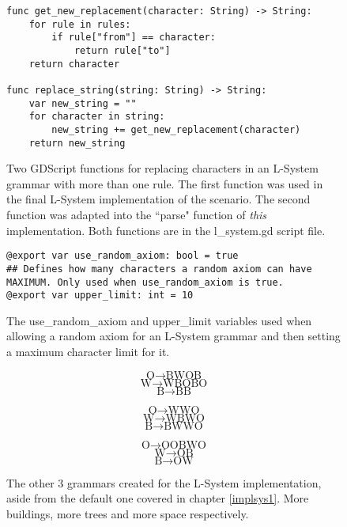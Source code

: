 \begin{figure}[H]
    \centering
    \begin{lstlisting}
func get_new_replacement(character: String) -> String:
	for rule in rules:
		if rule["from"] == character:
			return rule["to"]
	return character

func replace_string(string: String) -> String:
	var new_string = ""
	for character in string:
		new_string += get_new_replacement(character)
	return new_string
    \end{lstlisting}
    \caption{Two GDScript functions for replacing characters in an L-System grammar with more than one rule. The first function was used in the final L-System implementation of the scenario. The second function was adapted into the ``parse" function of \emph{this} implementation. Both functions are in the l\_system.gd script file.}
    \label{fig:lsystem2}
\end{figure}

\begin{figure}[H]
    \centering
    \begin{lstlisting}
@export var use_random_axiom: bool = true
## Defines how many characters a random axiom can have MAXIMUM. Only used when use_random_axiom is true.
@export var upper_limit: int = 10
    \end{lstlisting}
    \caption{The use\_random\_axiom and upper\_limit variables used when allowing a random axiom for an L-System grammar and then setting a maximum character limit for it.}
    \label{fig:lsystem3}
\end{figure}

\begin{figure}[H]
    \centering
    $$ \mbox{O} \rightarrow \mbox{B}\mbox{W}\mbox{O}\mbox{B} $$
    $$ \mbox{W} \rightarrow \mbox{W}\mbox{B}\mbox{O}\mbox{B}\mbox{O} $$
    $$ \mbox{B} \rightarrow \mbox{B}\mbox{B} $$
    
    $$ \mbox{O} \rightarrow \mbox{W}\mbox{W}\mbox{O} $$ 
    $$ \mbox{W} \rightarrow \mbox{W}\mbox{B}\mbox{W}\mbox{O} $$
    $$ \mbox{B} \rightarrow \mbox{B}\mbox{W}\mbox{W}\mbox{O} $$
    
    $$ \mbox{O} \rightarrow \mbox{O}\mbox{O}\mbox{B}\mbox{W}\mbox{O} $$ 
    $$ \mbox{W} \rightarrow \mbox{O}\mbox{B} $$
    $$ \mbox{B} \rightarrow \mbox{O}\mbox{W} $$
    \caption{The other 3 grammars created for the L-System implementation, aside from the default one covered in chapter \ref{implsys1}. More buildings, more trees and more space respectively.}
    \label{fig:lsystem4}
\end{figure}

